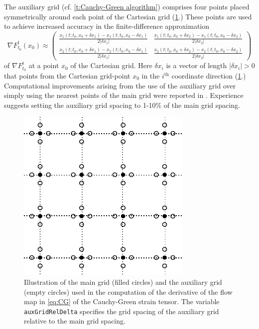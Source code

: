 \documentclass{article}
\begin{document}
The auxiliary grid (cf. \cref{t:Cauchy-Green algorithm}) comprises four points placed symmetrically around each point of the Cartesian grid (\cref{f:main and auxiliary grids}.) These points are used to achieve increased accuracy in the finite-difference approximation
\[
\nabla F_{t_0}^t(x_0) \approx
\left(\begin{array}{cc}
\frac{x_1(t;t_0,x_0 + \delta x_1) - x_1(t;t_0,x_0 - \delta x_1)}{2\vert\delta x_1\vert} & \frac{x_1(t;t_0,x_0+\delta x_2) - x_1(t;t_0,x_0-\delta x_2)}{2\vert\delta x_2\vert}\\
\frac{x_2(t;t_0,x_0+\delta x_1) - x_2(t;t_0,x_0 - \delta x_1)}{2\vert\delta x_1\vert} & \frac{x_2(t;t_0,x_0 + \delta x_2) - x_2(t;t_0,x_0 - \delta x_2)}{2\vert\delta x_2\vert}
\end{array}\right)
\]
of $\nabla F_{t_0}^t$ at a point $x_0$ of the Cartesian grid. Here $\delta x_i$ is a vector of length $\vert\delta x_i\vert > 0$ that points from the Cartesian grid-point $x_0$ in the $i^\text{th}$ coordinate direction (\cref{f:main and auxiliary grids}.) Computational improvements arising from the use of the auxiliary grid over simply using the nearest points of the main grid were reported in \textcite{farazmand12:_comput_lagran}. Experience suggests setting the auxiliary grid spacing to 1-10\% of the main grid spacing.

\begin{figure}
\begin{center}
\includegraphics[width=.5\textwidth]{graphics/main_aux_grids}
\end{center}
\caption{Illustration of the main grid (filled circles) and the auxiliary grid (empty circles) used in the computation of the derivative of the flow map in \cref{eq:CG} of the Cauchy-Green strain tensor. The variable \lstinline!auxGridRelDelta! specifies the grid spacing of the auxiliary grid relative to the main grid spacing.}
\label{f:main and auxiliary grids}
\end{figure}
\end{document}
